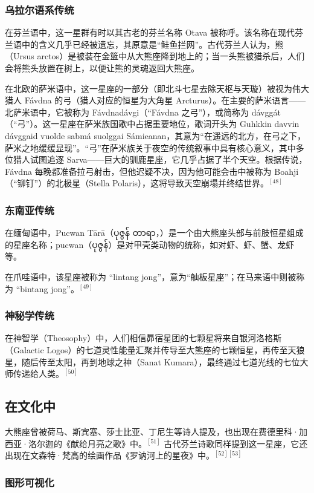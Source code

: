 \subsubsection{乌拉尔语系传统}  
在芬兰语中，这一星群有时以其古老的芬兰名称 Otava 被称呼。该名称在现代芬兰语中的含义几乎已经被遗忘，其原意是“鲑鱼拦网”。古代芬兰人认为，熊（Ursus arctos）是被装在金篮中从大熊座降到地上的；当一头熊被猎杀后，人们会将熊头放置在树上，以便让熊的灵魂返回大熊座。

在北欧的萨米语中，这一星座的一部分（即北斗七星去除天枢与天璇）被视为伟大猎人 Fávdna 的弓（猎人对应的恒星为大角星 Arcturus）。在主要的萨米语言——北萨米语中，它被称为 Fávdnadávgi（“Fávdna 之弓”），或简称为 dávggát（“弓”）。这一星座在萨米族国歌中占据重要地位，歌词开头为 Guhkkin davvin dávggaid vuolde sabmá suolggai Sámieanan，其意为“在遥远的北方，在弓之下，萨米之地缓缓显现”。“弓”在萨米族关于夜空的传统叙事中具有核心意义，其中多位猎人试图追逐 Sarva——巨大的驯鹿星座，它几乎占据了半个天空。根据传说，Fávdna 每晚都准备拉弓射击，但他迟疑不决，因为他可能会击中被称为 Boahji（“铆钉”）的北极星（Stella Polaris），这将导致天空崩塌并终结世界。$^{[48]}$
\subsubsection{东南亚传统}  
在缅甸语中，Pucwan Tārā（ပုဇွန် တာရာ，）是一个由大熊座头部与前肢恒星组成的星座名称；pucwan（ပုဇွန်）是对甲壳类动物的统称，如对虾、虾、蟹、龙虾等。

在爪哇语中，该星座被称为 “lintang jong”，意为“舢板星座”；在马来语中则被称为 “bintang jong”。$^{[49]}$
\subsubsection{神秘学传统}  
在神智学（Theosophy）中，人们相信昴宿星团的七颗星将来自银河洛格斯（Galactic Logos）的七道灵性能量汇聚并传导至大熊座的七颗恒星，再传至天狼星，随后传至太阳，再到地球之神（Sanat Kumara），最终通过七道光线的七位大师传递给人类。$^{[50]}$
\subsection{在文化中}  
大熊座曾被荷马、斯宾塞、莎士比亚、丁尼生等诗人提及，也出现在费德里科·加西亚·洛尔迦的《献给月亮之歌》中。$^{[51]}$ 古代芬兰诗歌同样提到这一星座，它还出现在文森特·梵高的绘画作品《罗讷河上的星夜》中。$^{[52][53]}$
\subsubsection{图形可视化}
